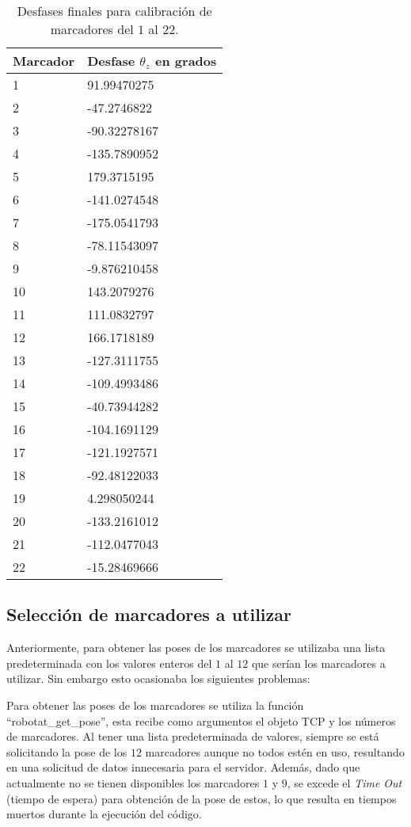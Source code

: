 \begin{table}[!ht]
	\centering
	\begin{tabular}{|l|l|}
		\hline
		\textbf{Marcador} & \textbf{Desfase $\theta_z$ en grados} \\ \hline
		1 & 91.99470275 \\ \hline
		2 & -47.2746822 \\ \hline
		3 & -90.32278167 \\ \hline
		4 & -135.7890952 \\ \hline
		5 & 179.3715195 \\ \hline
		6 & -141.0274548 \\ \hline
		7 & -175.0541793 \\ \hline
		8 & -78.11543097 \\ \hline
		9 & -9.876210458 \\ \hline
		10 & 143.2079276 \\ \hline
		11 & 111.0832797 \\ \hline
		12 & 166.1718189 \\ \hline
		13 & -127.3111755 \\ \hline
		14 & -109.4993486 \\ \hline
		15 & -40.73944282 \\ \hline
		16 & -104.1691129 \\ \hline
		17 & -121.1927571 \\ \hline
		18 & -92.48122033 \\ \hline
		19 & 4.298050244 \\ \hline
		20 & -133.2161012 \\ \hline
		21 & -112.0477043 \\ \hline
		22 & -15.28469666 \\ \hline
	\end{tabular}
	\caption{Desfases finales para calibración de marcadores del $1$ al $22$.}
	\label{cuadro:desfases_finales}
\end{table}

\subsection{Selección de marcadores a utilizar}
Anteriormente, para obtener las poses de los marcadores se utilizaba una lista predeterminada con los valores enteros del $1$ al $12$ que serían los marcadores a utilizar. Sin embargo esto ocasionaba los siguientes problemas:

Para obtener las poses de los marcadores se utiliza la función ``robotat\_get\_pose'', esta recibe como argumentos el objeto TCP y los números de marcadores. Al tener una lista predeterminada de valores, siempre se está solicitando la pose de los $12$ marcadores aunque no todos estén en uso, resultando en una solicitud de datos innecesaria para el servidor. Además, dado que actualmente no se tienen disponibles los marcadores $1$ y $9$, se excede el \textit{Time Out} (tiempo de espera) para obtención de la pose de estos, lo que resulta en tiempos muertos durante la ejecución del código.

